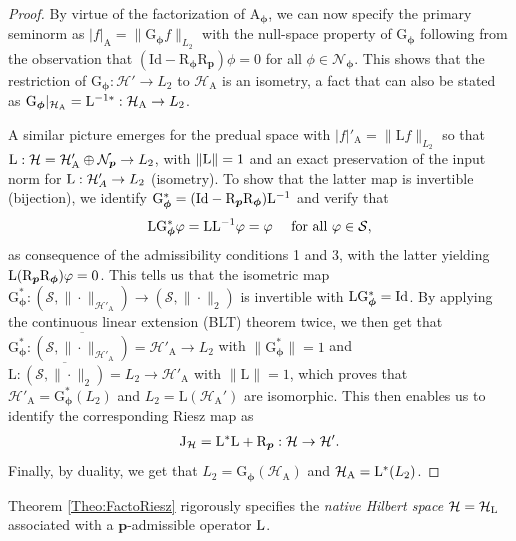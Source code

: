 \documentclass[11pt, english,english]{article}
\newcommand{\Lop}{{\rm L}}
\def\V#1{{\boldsymbol{#1}}}         %
\def\Spc#1{{\mathcal{#1}}}  %
\def\Op#1{{\mathrm{#1}}}  %
\def\Identity{\mathrm{Id}} %
\renewcommand{\[}{\begin{equation}}
\renewcommand{\]}[1]{\label{eq:#1}\end{equation}}
\begin{document}
\begin{proof} [\small Proof]
{\small By virtue of the factorization of $\Op A_\V \phi$, we can now specify the primary seminorm as
$|f|_{\Op A}=\|\Op G_\V \phi f\|_{L_2}$ with the null-space property of $\Op G_\V \phi$ following from the observation that $(\Identity-\Op R_{\V \phi}\Op R_{\V p})\phi=0$ for all $\phi \in \Spc N_{\V \phi}$.
This shows that the restriction of $\Op G_\V \phi: \Spc H' \to L_2$ to
$\Spc H_{\Op A}$ is an isometry, a fact that can also be stated as $\Op G_\V \phi|_{\Spc H_\Op A}=\Lop^{-1\ast}: \Spc H_{\Op A} \to L_2$. 

A similar picture emerges for the predual space with $|f|'_{\Op A}=\|\Op L f\|_{L_2}$ so that
$\Lop: \Spc H=\Spc H'_\Op A \oplus \Spc N_{\V p}\to L_2$, with $\|\Lop\|=1$ and an exact preservation of the input norm for $\Lop: \Spc H'_A\to L_2 $ (isometry).
To show that the latter map is invertible (bijection), we identify $\Op G_\V \phi^\ast=(\Identity-\Op R_{\V p}\Op R_{\V \phi})\Op \Lop^{-1}$ and verify that
\begin{align}
\Lop \Op G_\V \phi^\ast \varphi=\Lop\Lop^{-1}\varphi=\varphi  \quad \mbox{ for all }  \varphi \in \Spc S,	
\end{align}
as consequence of the admissibility conditions 1 and 3, with the latter yielding $\Lop(\Op R_{\V p}\Op R_{\V \phi})\varphi=0$. This tells us that the isometric map $\Op G_\V \phi^\ast: (\Spc S, \|\cdot\|_{\Spc H'_{\Op A}}) \to (\Spc S, \|\cdot\|_2)$ is invertible with $\Lop\Op G_\V \phi^\ast=\Identity$. By applying the continuous linear extension (BLT) theorem \cite{Reed1975} twice, we then get that $\Op G_\V \phi^\ast: \overline{(\Spc S, \|\cdot\|_{\Spc H'_{\Op A}})}=\Spc H'_{\Op A} \to L_2$ with $\|\Op G_\V \phi^\ast\|=1$ 
and $\Op L: \overline{(\Spc S, \|\cdot\|_2)}=L_2 \to \Spc H'_{\Op A}$ with $\|\Op L\|=1$, which
proves that $\Spc H'_{\Op A}=\Op G_\V \phi^\ast(L_2)$ and $L_2=\Op L(\Spc H_\Op A')$ are isomorphic. 
This then enables us to identify the corresponding Riesz map as
\begin{align}
\Op J_{\Spc H}=\Lop^\ast \Lop + \Op R_{\V p}: \Spc H \to \Spc H'.
\end{align}
Finally, by duality, we get that $L_2=\Op G_\V \phi(\Spc H_{\Op A})$ and $\Spc H_\Op A=\Lop^\ast(L_2)$.
} %
\end{proof}
Theorem \ref{Theo:FactoRiesz} rigorously specifies the {\em native Hilbert space} $\Spc H=\Spc H_\Lop$ associated with a $\V p$-admissible operator $\Lop$.
\end{document}
